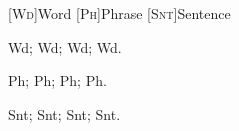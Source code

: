 \documentclass{article}
\begin{document}
\begin{acronym}[TEST]
  [\textsc{Wd}]{Word}
  [\textsc{Ph}]{Phrase}
  [\textsc{Snt}]{Sentence}
\end{acronym}

\ac{Wd}; \acs{Wd}; \acl{Wd}; \acf{Wd}.

\ac{Ph}; \acs{Ph}; \acl{Ph}; \acf{Ph}.

\ac{Snt}; \acs{Snt};  \acl{Snt}; \acf{Snt}.
\end{document}
